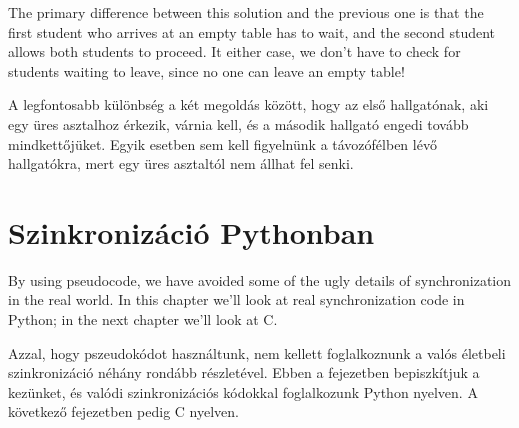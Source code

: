 \documentclass{book}
\newcommand{\clearemptydoublepage}{\newpage\cleardoublepage}
\begin{document}
The primary difference between this solution and the previous
one is that the first student who arrives at an empty table
has to wait, and the second student allows both students to
proceed.  It either case, we don't have to check for students
waiting to leave, since no one can leave an empty table!

A legfontosabb különbség a két megoldás között, hogy az
első hallgatónak, aki egy üres asztalhoz érkezik, várnia
kell, és a második hallgató engedi tovább mindkettőjüket.
Egyik esetben sem kell figyelnünk a távozófélben lévő
hallgatókra, mert egy üres asztaltól nem állhat fel senki.











\chapter{Szinkronizáció Pythonban}
\label{pysync}

By using pseudocode, we have avoided some of the ugly
details of synchronization in the real world.  In this chapter
we'll look at real synchronization code in Python; in the
next chapter we'll look at C.

Azzal, hogy pszeudokódot használtunk, nem kellett foglalkoznunk
a valós életbeli szinkronizáció néhány rondább részletével.
Ebben a fejezetben bepiszkítjuk a kezünket, és valódi szinkronizációs
kódokkal foglalkozunk Python nyelven. A következő fejezetben pedig C nyelven.
\end{document}
